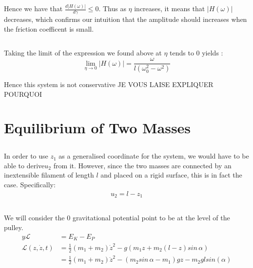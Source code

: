 \documentclass{article}
\begin{document}
Hence we have that $\frac{d\left|H(\omega)\right|}{d\gamma} \le 0$.
Thus as $\eta$ increases, it means that $\left|H(\omega)\right|$ decreases, which confirms our intuition that the amplitude should increases when the friction coefficent is small.

\subsection{} %

Taking the limit of the expression we found above at $\eta$ tends to 0 yields :
$$\lim_{\eta \to 0}\left|H(\omega)\right| = \frac{\omega}{l(\omega_0^2-\omega^2)} $$

Hence this system is not conservative JE VOUS LAISE EXPLIQUER POURQUOI


\section{Equilibrium of Two Masses}

\subsection{} %

In order to use $z_1$ as a generalised coordinate for the system, we would have to be able to derive$u_2$ from it. However, since the two masses are connected by an inextensible filament of length $l$ and placed on a rigid surface, this is in fact the case. Specifically:
\begin{align*}
	u_2 = l - z_1
\end{align*}

\subsection{} %

We will consider the 0 gravitational potential point to be at the level of the pulley.
\begin{align*}y
	\mathcal{L} &= E_{K} - E_P\\
	\mathcal{L}(z,\dot{z},t) &= \frac{1}{2}(m_1+m_2)\dot{z}^2 - g(m_1z + m_2(l-z)sin\,\alpha)\\
	&= \frac{1}{2}(m_1+m_2)\dot{z}^2 - (m_2sin\,\alpha - m_1)g z - m_2 g l sin(\alpha)
\end{align*}

\subsection{} %
\end{document}
